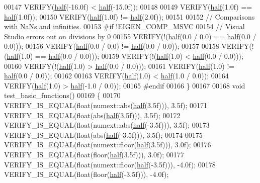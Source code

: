 \begin{DoxyCode}
00147   VERIFY(\hyperlink{struct_eigen_1_1half}{half}(-16.0f) < \hyperlink{struct_eigen_1_1half}{half}(-15.0f));
00148 
00149   VERIFY(\hyperlink{struct_eigen_1_1half}{half}(1.0f) == \hyperlink{struct_eigen_1_1half}{half}(1.0f));
00150   VERIFY(\hyperlink{struct_eigen_1_1half}{half}(1.0f) != \hyperlink{struct_eigen_1_1half}{half}(2.0f));
00151 
00152   \textcolor{comment}{// Comparisons with NaNs and infinities.}
00153 \textcolor{preprocessor}{#if !EIGEN\_COMP\_MSVC}
00154   \textcolor{comment}{// Visual Studio errors out on divisions by 0}
00155   VERIFY(!(\hyperlink{struct_eigen_1_1half}{half}(0.0 / 0.0) == \hyperlink{struct_eigen_1_1half}{half}(0.0 / 0.0)));
00156   VERIFY(\hyperlink{struct_eigen_1_1half}{half}(0.0 / 0.0) != \hyperlink{struct_eigen_1_1half}{half}(0.0 / 0.0));
00157 
00158   VERIFY(!(\hyperlink{struct_eigen_1_1half}{half}(1.0) == \hyperlink{struct_eigen_1_1half}{half}(0.0 / 0.0)));
00159   VERIFY(!(\hyperlink{struct_eigen_1_1half}{half}(1.0) < \hyperlink{struct_eigen_1_1half}{half}(0.0 / 0.0)));
00160   VERIFY(!(\hyperlink{struct_eigen_1_1half}{half}(1.0) > \hyperlink{struct_eigen_1_1half}{half}(0.0 / 0.0)));
00161   VERIFY(\hyperlink{struct_eigen_1_1half}{half}(1.0) != \hyperlink{struct_eigen_1_1half}{half}(0.0 / 0.0));
00162 
00163   VERIFY(\hyperlink{struct_eigen_1_1half}{half}(1.0) < \hyperlink{struct_eigen_1_1half}{half}(1.0 / 0.0));
00164   VERIFY(\hyperlink{struct_eigen_1_1half}{half}(1.0) > \hyperlink{struct_eigen_1_1half}{half}(-1.0 / 0.0));
00165 \textcolor{preprocessor}{#endif}
00166 \}
00167 
00168 \textcolor{keywordtype}{void} test\_basic\_functions()
00169 \{
00170   VERIFY\_IS\_EQUAL(\textcolor{keywordtype}{float}(numext::abs(\hyperlink{struct_eigen_1_1half}{half}(3.5f))), 3.5f);
00171   VERIFY\_IS\_EQUAL(\textcolor{keywordtype}{float}(abs(\hyperlink{struct_eigen_1_1half}{half}(3.5f))), 3.5f);
00172   VERIFY\_IS\_EQUAL(\textcolor{keywordtype}{float}(numext::abs(\hyperlink{struct_eigen_1_1half}{half}(-3.5f))), 3.5f);
00173   VERIFY\_IS\_EQUAL(\textcolor{keywordtype}{float}(abs(\hyperlink{struct_eigen_1_1half}{half}(-3.5f))), 3.5f);
00174 
00175   VERIFY\_IS\_EQUAL(\textcolor{keywordtype}{float}(numext::floor(\hyperlink{struct_eigen_1_1half}{half}(3.5f))), 3.0f);
00176   VERIFY\_IS\_EQUAL(\textcolor{keywordtype}{float}(floor(\hyperlink{struct_eigen_1_1half}{half}(3.5f))), 3.0f);
00177   VERIFY\_IS\_EQUAL(\textcolor{keywordtype}{float}(numext::floor(\hyperlink{struct_eigen_1_1half}{half}(-3.5f))), -4.0f);
00178   VERIFY\_IS\_EQUAL(\textcolor{keywordtype}{float}(floor(\hyperlink{struct_eigen_1_1half}{half}(-3.5f))), -4.0f);

\end{DoxyCode}
